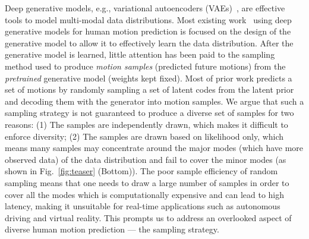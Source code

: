 \documentclass[runningheads]{llncs}
\begin{document}
	Deep generative models, e.g., variational autoencoders (VAEs)~\cite{kingma2013auto}, are effective tools to model multi-modal data distributions. Most existing work~\cite{walker2017pose,lin2018human,barsoum2018hp,ruiz2018human,kundu2019bihmp,yan2018mt,aliakbarian2020stochastic} using deep generative models for human motion prediction is focused on the design of the generative model to allow it to effectively learn the data distribution. After the generative model is learned, little attention has been paid to the sampling method used to produce \emph{motion samples} (predicted future motions) from the \emph{pretrained} generative model (weights kept fixed). Most of prior work predicts a set of motions by randomly sampling a set of latent codes from the latent prior and decoding them with the generator into motion samples. We argue that such a sampling strategy is not guaranteed to produce a diverse set of samples for two reasons: (1) The samples are independently drawn, which makes it difficult to enforce diversity; (2) The samples are drawn based on likelihood only, which means many samples may concentrate around the major modes (which have more observed data) of the data distribution and fail to cover the minor modes (as shown in Fig.~\ref{fig:teaser} (Bottom)). The poor sample efficiency of random sampling means that one needs to draw a large number of samples in order to cover all the modes which is computationally expensive and can lead to high latency, making it unsuitable for real-time applications such as autonomous driving and virtual reality.  This prompts us to address an overlooked aspect of diverse human motion prediction --- the sampling strategy.
	
\end{document}
